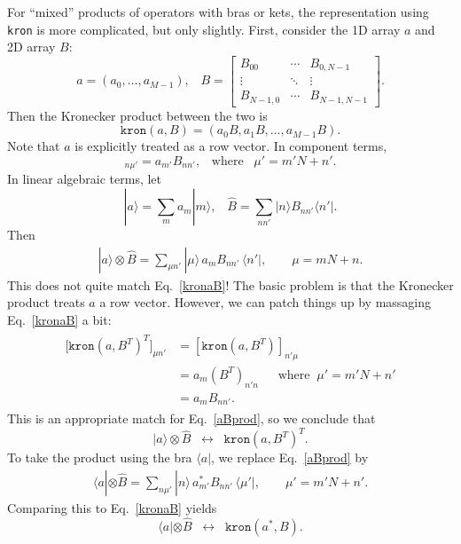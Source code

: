 \documentclass[pra,12pt]{revtex4}
\begin{document}
For ``mixed'' products of operators with bras or kets, the
representation using \texttt{kron} is more complicated, but only
slightly.  First, consider the 1D array $a$ and 2D array $B$:
\begin{equation}
  a = (a_0, \dots, a_{M-1}), \;\;\;
  B = \begin{bmatrix}B_{00} & \cdots & B_{0,N-1} \\ \vdots & \ddots & \vdots \\  B_{N-1,0} & \cdots & B_{N-1,N-1} \end{bmatrix}.
\end{equation}
Then the Kronecker product between the two is
\begin{equation}
  \texttt{kron}(a, B) = (a_0 B, a_1 B, \dots, a_{M-1} B).
\end{equation}
Note that $a$ is explicitly treated as a row vector.  In component
terms,
\begin{equation}
  [\texttt{kron}(a, B)]_{n\mu'} = a_{m'} B_{nn'}, \;\;\;\mathrm{where}\;\;\;
  \mu' = m'N+n'.
  \label{kronaB}
\end{equation}
In linear algebraic terms, let
\begin{equation}
  |a\rangle = \sum_m a_m |m\rangle, \;\;\; \hat{B} = \sum_{nn'}
  |n\rangle B_{nn'} \langle n'|.
\end{equation}
Then
\begin{align}
  |a\rangle \otimes \hat{B} = \sum_{\mu n'} |\mu\rangle \,
  a_m B_{nn'} \, \langle n'|, \qquad \mu = mN + n.
  \label{aBprod}
\end{align}
This does not quite match Eq.~\eqref{kronaB}!  The basic problem is
that the Kronecker product treats $a$ a row vector.  However, we can
patch things up by massaging Eq.~\eqref{kronaB} a bit:
\begin{align}
  \begin{aligned}
    \left.[\right.\texttt{kron}(a, B^T)^T]_{\mu n'} &=
    [\texttt{kron}(a, B^T)]_{n' \mu} \\
    &= a_{m} (B^T)_{n'n} \quad\;\;\mathrm{where}\;\; \mu' = m'N + n' \\
    &= a_{m} B_{nn'}.
  \end{aligned}
\end{align}
This is an appropriate match for Eq.~\eqref{aBprod}, so we conclude
that
\begin{equation}
  |a\rangle \otimes \hat{B} \;\;\leftrightarrow\;\;
  \texttt{kron}(a, B^T)^T.
\end{equation}
To take the product using the bra $\langle a|$, we replace
Eq.~\eqref{aBprod} by
\begin{align}
  \langle a| \otimes \hat{B} = \sum_{n\mu'} |n\rangle \,
  a_{m'}^* B_{nn'} \, \langle \mu'|, \qquad \mu' = m'N + n'.
\end{align}
Comparing this to Eq.~\eqref{kronaB} yields
\begin{equation}
  \langle a| \otimes \hat{B} \;\;\leftrightarrow\;\;
  \texttt{kron}(a^*, B).
\end{equation}
\end{document}
